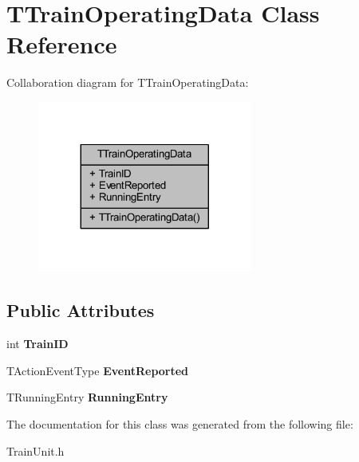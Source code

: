 \hypertarget{class_t_train_operating_data}{}\section{T\+Train\+Operating\+Data Class Reference}
\label{class_t_train_operating_data}


Collaboration diagram for T\+Train\+Operating\+Data\+:\nopagebreak
\begin{figure}[H]
\begin{center}
\leavevmode
\includegraphics[width=200pt]{class_t_train_operating_data__coll__graph}
\end{center}
\end{figure}
\subsection*{Public Attributes}
\begin{DoxyCompactItemize}
\item 
\mbox{\label{class_t_train_operating_data_aa75dba204a2655d41e74c42694e92b81}} 
int {\bfseries Train\+ID}
\item 
\mbox{\label{class_t_train_operating_data_afd7bc1b962e312062e0d27f0380e8c69}} 
T\+Action\+Event\+Type {\bfseries Event\+Reported}
\item 
\mbox{\label{class_t_train_operating_data_a9a46cddc0bed9cbbfff18b8909ae8047}} 
T\+Running\+Entry {\bfseries Running\+Entry}
\end{DoxyCompactItemize}


The documentation for this class was generated from the following file\+:\begin{DoxyCompactItemize}
\item 
Train\+Unit.\+h\end{DoxyCompactItemize}
